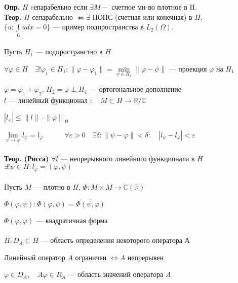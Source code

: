 \documentclass[12pt, a4paper]{article}
\begin{document}
\textbf{Опр.} $H$ cепарабельно если $ \exists M - $ счетное мн-во плотное в H. \\

\textbf{Теор.} $H$ сепарабельно $ \Leftrightarrow \exists $ ПОНС (счетная или конечная) в $H$. \\ 

$ \{ u: \int\limits_{\Omega}^{} u dx = 0 \} $ --- пример подпространства в $ L_2(\Omega) $. \\ \\ 

Пусть $ H_1 $ --- подпространство в $H$

$ \forall \varphi \in H \quad \exists ! \varphi_1 \in H_1: \| \varphi - \varphi_1 \| = \underset{\psi \in H_1}{\min}  \| \varphi - \psi \| $ --- проекция $\varphi$ на $H_1$

$ \varphi = \varphi_1 + \varphi_2 $, \quad \quad $ H_2 = \varphi \perp H_1 $ --- ортогональное дополнение \\

$l$ --- линейный функционал $: \quad M \subset H \rightarrow \mathbb{R}/\mathbb{C} $

$ |l_{\varphi}| \leq \|l\| \cdot {\|\varphi\|}_H $

$ \underset{\psi \rightarrow \varphi}{\lim} l_\psi = l_\varphi \quad \quad \quad \forall \varepsilon > 0 \quad \exists \delta: \| \psi - \varphi \| < \delta: \quad |l_\psi - l_\varphi| < \varepsilon$ \\ \\

\textbf{Теор. (Рисса)} $ \forall l $ --- непрерывного линейного функционала в $H$ $\exists! \psi \in H:  l_\varphi = (\varphi, \psi)$ \\ \\


Пусть $M$ --- плотно в $H$, \quad $\Phi: M \times M \rightarrow \mathbb{C} (\mathbb{R})  $

$ \Phi(\varphi, \psi): \Phi(\varphi, \psi) = \overline{\Phi(\psi, \varphi)} $

$ \Phi(\varphi, \varphi) $ --- квадратичная форма \\ \\


$ H: D_A \subset H $ --- область определения некоторого оператора А

Линейный оператор $A$ ограничен $\Leftrightarrow A$ непрерывен

$\varphi \in D_A, \quad A\varphi \in R_A$ --- область значений оператора $A$
\end{document}
